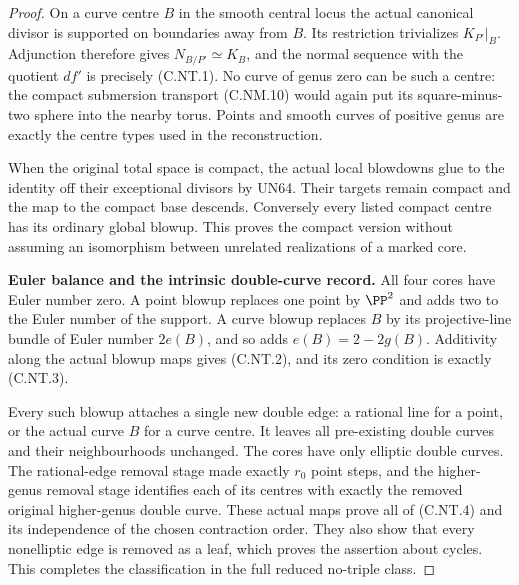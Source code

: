 \begin{proof}
On a curve centre $B$ in the smooth central
locus the actual canonical divisor is supported
on boundaries away from $B$. Its restriction
trivializes $K_{P'}|_B$. Adjunction therefore gives
$N_{B/P'}\simeq K_B$, and the normal sequence
with the quotient $df'$ is precisely (C.NT.1).
No curve of genus zero can be such a centre:
the compact submersion transport (C.NM.10)
would again put its square-minus-two sphere
into the nearby torus. Points and smooth curves
of positive genus are exactly the centre
types used in the reconstruction.

When the original total space is compact, the
actual local blowdowns glue to the identity
off their exceptional divisors by UN64.
Their targets remain compact and the map to
the compact base descends. Conversely every
listed compact centre has its ordinary global
blowup. This proves the compact version without
assuming an isomorphism between unrelated
realizations of a marked core.

\par\medskip\noindent\textbf{Euler balance and the intrinsic double-curve record.}
All four cores have Euler number zero. A point
blowup replaces one point by $\PP^2$ and adds two
to the Euler number of the support. A curve
blowup replaces $B$ by its projective-line bundle
of Euler number $2e(B)$, and so adds
$e(B)=2-2g(B)$. Additivity along the actual
blowup maps gives (C.NT.2), and its zero
condition is exactly (C.NT.3).

Every such blowup attaches a single new double
edge: a rational line for a point, or the actual
curve $B$ for a curve centre. It leaves all
pre-existing double curves and their
neighbourhoods unchanged. The cores have only
elliptic double curves. The rational-edge
removal stage made exactly $r_0$ point steps,
and the higher-genus removal stage identifies
each of its centres with exactly the removed
original higher-genus double curve. These
actual maps prove all of (C.NT.4) and its
independence of the chosen contraction order.
They also show that every nonelliptic edge
is removed as a leaf, which proves the
assertion about cycles. This completes the
classification in the full reduced
no-triple class.
\end{proof}
